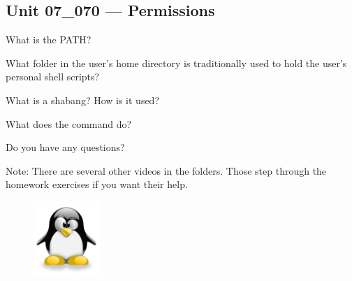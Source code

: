 \documentclass[letterpaper,12pt]{exam}
\newcommand{\unit}{Unit 07}
\begin{document}
\begin {questions}
\section*{\unit\_070 --- Permissions}
\begin{samepage}
\question What is the PATH? 
\vspace{5mm}
\end{samepage}

\begin{samepage}
\question What folder in the user's home directory is traditionally used to hold the user's personal shell scripts? 
\vspace{5mm}
\end{samepage}

\begin{samepage}
\question What is a shabang?  How is it used? 
\vspace{5mm}
\end{samepage}

\begin{samepage}
\question What does the  command do? 
\vspace{5mm}
\end{samepage}

\begin{samepage}
\question Do you have any questions? 
\vspace{5mm}
\end{samepage}

\end{questions}
\vspace{40mm}
\noindent Note: There are several other videos in the folders.  Those step through the homework exercises if you want their help.

\begin{figure}[b]\label{end}
	\center
	\includegraphics[width=1in]{tux}
\end{figure}
\end{document}
